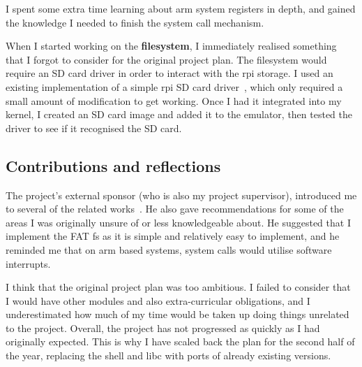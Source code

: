 \documentclass{article}
\begin{document}
I spent some extra time learning about \gls{arm} system registers in depth, and
gained the knowledge I needed to finish the system call mechanism.

When I started working on the \textbf{filesystem}, I immediately realised
something that I forgot to consider for the original project plan. The
filesystem would require an SD card driver in order to interact with the
\gls{rpi} storage. I used an existing implementation of a simple \gls{rpi} SD
card driver~\cite{rpi-boot-gh}, which only required a small amount of
modification to get working. Once I had it integrated into my kernel, I created
an SD card image and added it to the emulator, then tested the driver to see if
it recognised the SD card.

\subsection{Contributions and reflections}
The project's external sponsor (who is also my project supervisor), introduced
me to several of the related works~\cite{netBSD-git, riscOS-source}. He also
gave recommendations for some of the areas I was originally unsure of or less
knowledgeable about. He suggested that I implement the FAT \gls{fs} as it is
simple and relatively easy to implement, and he reminded me that on \gls{arm}
based systems, system calls would utilise software interrupts.

I think that the original project plan was too ambitious. I failed to consider
that I would have other modules and also extra-curricular obligations, and I
underestimated how much of my time would be taken up doing things unrelated to
the project. Overall, the project has not progressed as quickly as I had
originally expected. This is why I have scaled back the plan for the second
half of the year, replacing the shell and libc with ports of already existing
versions.

















\clearpage


\printglossaries
\end{document}

